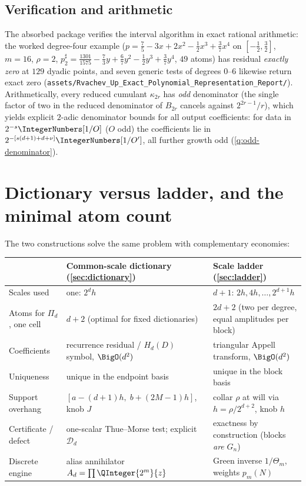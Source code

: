 \documentclass[11pt,oneside]{article}
\numberwithin{equation}{section}
\theoremstyle{definition}
\theoremstyle{remark}
\newcommand{\ThetaTM}{\Theta}
\newcommand{\PiD}{\Pi_d}
\begin{document}
\subsection{Verification and arithmetic}

The absorbed package verifies the interval algorithm in exact
rational arithmetic: the worked degree-four example
($p=\tfrac75-3x+2x^{2}-\tfrac12x^{3}+\tfrac37x^{4}$ on
$[-\tfrac12,\tfrac32]$, $m=16$, $\rho=2$,
$p^{\sharp}_2=\tfrac{1301}{1575}-\tfrac73y+\tfrac67y^{2}
-\tfrac12y^{3}+\tfrac37y^{4}$, $49$ atoms) has residual
\emph{exactly zero} at $129$ dyadic points, and seven generic tests
of degrees $0$--$6$ likewise return exact zero
(\nolinkurl{assets/Rvachev_Up_Exact_Polynomial_Representation_Report/}).
Arithmetically, every reduced cumulant $\kappa_{2r}$ has \emph{odd}
denominator (the single factor of two in the reduced denominator of
$B_{2r}$ cancels against $2^{2r-1}/r$), which yields explicit
$2$-adic denominator bounds for all output coefficients: for data in
$2^{-s}\IntegerNumbers[1/O]$ ($O$ odd) the coefficients lie in
$2^{-[s(d+1)+d+\nu]}\IntegerNumbers[1/O']$, all further growth odd
(\cref{q:odd-denominator}).

\section{Dictionary versus ladder, and the minimal atom count}
\label{sec:comparison}

The two constructions solve the same problem with complementary
economies:

\begin{center}
\small
\begin{tabularx}{\textwidth}{@{}p{}XX@{}}
\toprule
 & Common-scale dictionary (\cref{sec:dictionary})
 & Scale ladder (\cref{sec:ladder})\\
\midrule
Scales used & one: $2^{d}h$ & $d+1$: $2h,4h,\dots,2^{d+1}h$\\
Atoms for $\PiD$, one cell & $d+2$ (optimal for fixed dictionaries)
 & $2d+2$ (two per degree, equal amplitudes per block)\\
Coefficients & recurrence residual / $H_d(D)$ symbol,
 $\BigO(d^{2})$ & triangular Appell transform, $\BigO(d^{2})$\\
Uniqueness & unique in the endpoint basis
 & unique in the block basis\\
Support overhang & $[a-(d+1)h,\;b+(2M-1)h]$, knob $J$
 & collar $\rho$ at will via $h=\rho/2^{d+2}$, knob $h$\\
Certificate / defect & one-scalar Thue--Morse test; explicit
 $\mathcal D_d$ & exactness by construction (blocks \emph{are}
 $G_n$)\\
Discrete engine & alias annihilator $A_d=\prod\QInteger{2^{m}}{z}$
 & Green inverse $1/\ThetaTM_{m}$, weights $p_m(N)$\\
\bottomrule
\end{tabularx}
\end{center}
\end{document}
